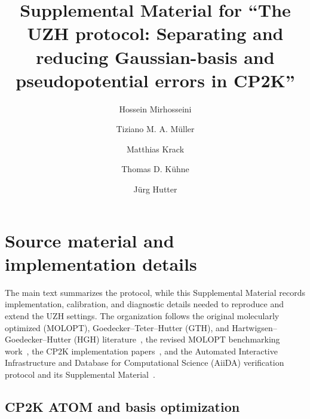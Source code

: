 \documentclass[aps,prb,preprint,amsmath,amssymb,superscriptaddress,longbibliography,floatfix]{revtex4-2}
\begin{document}
\title{Supplemental Material for ``The UZH protocol: Separating and reducing Gaussian-basis and pseudopotential errors in CP2K''}

\author{Hossein Mirhosseini}
\author{Tiziano M. A. M\"uller}
\author{Matthias Krack}
\author{Thomas D. K\"uhne}
\author{J\"urg Hutter}

\maketitle

\section{Source material and implementation details}

The main text summarizes the protocol, while this Supplemental Material records implementation, calibration, and diagnostic details needed to reproduce and extend the UZH settings. The organization follows the original molecularly optimized (MOLOPT), Goedecker--Teter--Hutter (GTH), and Hartwigsen--Goedecker--Hutter (HGH) literature~\cite{VandeVondele2007,Goedecker1996,Hartwigsen1998}, the revised MOLOPT benchmarking work~\cite{MullerThesis2024}, the CP2K implementation papers~\cite{CP2K2020,CP2KMadeSimple2026}, and the Automated Interactive Infrastructure and Database for Computational Science (AiiDA) verification protocol and its Supplemental Material~\cite{Huber2021,Bosoni2024}.

\subsection{CP2K ATOM and basis optimization}
\end{document}
